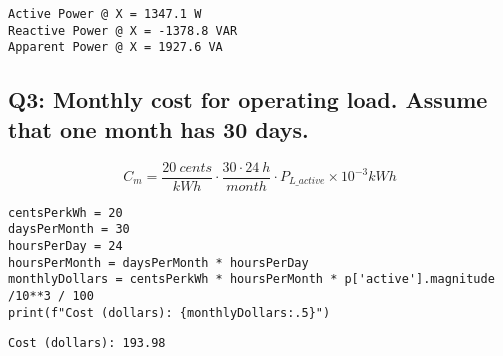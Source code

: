 \documentclass[11pt]{article}
\begin{document}
\begin{verbatim}
Active Power @ X = 1347.1 W
Reactive Power @ X = -1378.8 VAR
Apparent Power @ X = 1927.6 VA
\end{verbatim}

\subsection*{Q3: Monthly cost for operating load. Assume that one month has 30 days.}
\label{sec:orgbce9cb7}
\begin{equation*}
  C_m = \frac{20 \ \si{cents}}{\si{kWh}} \cdot \frac{30\cdot 24 \ \si{h}}{\si{month}} \cdot P_{L\_active}\times 10^{-3} \si{kWh}
\end{equation*}
\begin{verbatim}
centsPerkWh = 20
daysPerMonth = 30
hoursPerDay = 24
hoursPerMonth = daysPerMonth * hoursPerDay
monthlyDollars = centsPerkWh * hoursPerMonth * p['active'].magnitude /10**3 / 100
print(f"Cost (dollars): {monthlyDollars:.5}")
\end{verbatim}

\begin{verbatim}
Cost (dollars): 193.98
\end{verbatim}
\end{document}
